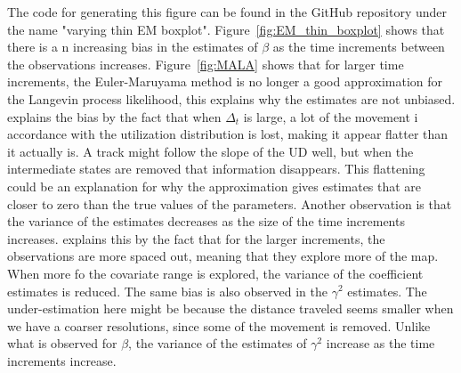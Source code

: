 The code for generating this figure can be found in the GitHub repository under the name "varying thin EM boxplot". Figure~\ref{fig:EM_thin_boxplot} shows that there is a n increasing bias in the estimates of $\beta$ as the time increments between the observations increases. Figure~\ref{fig:MALA} shows that for larger time increments, the Euler-Maruyama method is no longer a good approximation for the Langevin process likelihood, this explains why the estimates are not unbiased. \parencite{michelot_langevin_2019} explains the bias by the fact that when $\Delta_t$ is large, a lot of the movement i accordance with the utilization distribution is lost, making it appear flatter than it actually is. A track might follow the slope of the UD well, but when the intermediate states are removed that information disappears. This flattening could be an explanation for why the approximation gives estimates that are closer to zero than the true values of the parameters. Another observation is that the variance of the estimates decreases as the size of the time increments increases. \parencite{michelot_langevin_2019} explains this by the fact that for the larger increments, the observations are more spaced out, meaning that they explore more of the map. When more fo the covariate range is explored, the variance of the coefficient estimates is reduced. The same bias is also observed in the $\gamma^2$ estimates. The under-estimation here might be because the distance traveled seems smaller when we have a coarser resolutions, since some of the movement is removed. Unlike what is observed for $\beta$, the variance of the estimates of $\gamma^2$ increase as the time increments increase.

